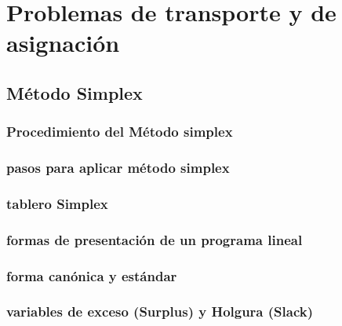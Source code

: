 \documentclass[
  letterpaper,
  DIV=11,
  numbers=noendperiod]{scrreprt}
\theoremstyle{definition}
\theoremstyle{definition}
\theoremstyle{remark}
\begin{document}
\hypertarget{problemas-de-transporte-y-de-asignaciuxf3n}{%
\chapter{Problemas de transporte y de
asignación}\label{problemas-de-transporte-y-de-asignaciuxf3n}}

\hypertarget{muxe9todo-simplex}{%
\section{Método Simplex}\label{muxe9todo-simplex}}

\hypertarget{procedimiento-del-muxe9todo-simplex}{%
\subsection{Procedimiento del Método
simplex}\label{procedimiento-del-muxe9todo-simplex}}

\hypertarget{pasos-para-aplicar-muxe9todo-simplex}{%
\subsection{pasos para aplicar método
simplex}\label{pasos-para-aplicar-muxe9todo-simplex}}

\hypertarget{tablero-simplex}{%
\subsection{tablero Simplex}\label{tablero-simplex}}

\hypertarget{formas-de-presentaciuxf3n-de-un-programa-lineal}{%
\subsection{formas de presentación de un programa
lineal}\label{formas-de-presentaciuxf3n-de-un-programa-lineal}}

\hypertarget{forma-canuxf3nica-y-estuxe1ndar}{%
\subsection{forma canónica y
estándar}\label{forma-canuxf3nica-y-estuxe1ndar}}

\hypertarget{variables-de-exceso-surplus-y-holgura-slack}{%
\subsection{variables de exceso (Surplus) y Holgura
(Slack)}\label{variables-de-exceso-surplus-y-holgura-slack}}
\end{document}
